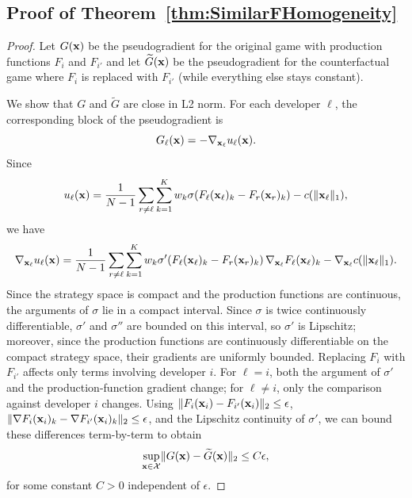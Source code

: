 \subsection{Proof of Theorem~\ref{thm:SimilarFHomogeneity}}
\label{app:SimilarFHomogeneity}
\SimilarFHomogeneity*
\begin{proof}
Let $G(\mathbf{x})$ be the pseudogradient for the original game with production functions $F_{i}$ and $F_{i'}$ and let $\widetilde{G}(\mathbf{x})$ be the pseudogradient for the counterfactual game where $F_{i}$ is replaced with $F_{i'}$ (while everything else stays constant). 

We show that $G$ and $\widetilde{G}$ are close in L2 norm. 
For each developer $\ell$, the corresponding block of the pseudogradient is
\[
G_\ell(\mathbf{x})=-\nabla_{\mathbf{x}_\ell}u_\ell(\mathbf{x}).
\]
Since
\[
u_\ell(\mathbf{x})=\frac{1}{N-1}\sum_{r\neq \ell}\sum_{k=1}^K w_k\sigma\!\left(F_\ell(\mathbf{x}_\ell)_k-F_r(\mathbf{x}_r)_k\right)-c(\lVert\mathbf{x}_\ell\rVert_1),
\]
we have
\[
\nabla_{\mathbf{x}_\ell}u_\ell(\mathbf{x})=\frac{1}{N-1}\sum_{r\neq \ell}\sum_{k=1}^K w_k \sigma' \!\left(F_\ell(\mathbf{x}_\ell)_k-F_r(\mathbf{x}_r)_k\right)\nabla_{\mathbf{x}_\ell}F_\ell(\mathbf{x}_\ell)_k-\nabla_{\mathbf{x}_\ell}c(\lVert\mathbf{x}_\ell\rVert_1).
\]
Since the strategy space is compact and the production functions are continuous, the arguments of $\sigma$ lie in a compact interval.
Since $\sigma$ is twice continuously differentiable, $\sigma'$ and $\sigma''$ are bounded on this interval, so $\sigma'$ is Lipschitz; moreover, since the production functions are continuously differentiable on the compact strategy space, their gradients are uniformly bounded.
Replacing $F_i$ with $F_{i'}$ affects only terms involving developer $i$.
For $\ell=i$, both the argument of $\sigma'$ and the production-function gradient change; for $\ell\neq i$, only the comparison against developer $i$ changes. 
Using $\lVert F_i(\mathbf{x}_i)-F_{i'}(\mathbf{x}_i)\rVert_2\leq\epsilon$, $\lVert \nabla F_i(\mathbf{x}_i)_k-\nabla F_{i'}(\mathbf{x}_i)_k\rVert_2\leq\epsilon$, and the Lipschitz continuity of $\sigma'$, we can bound these differences term-by-term to obtain
\[
\sup_{\mathbf{x}\in\mathcal X}\lVert G(\mathbf{x})-\widetilde G(\mathbf{x})\rVert_2 \leq C\epsilon,
\] 
for some constant $C>0$ independent of $\epsilon$.



\end{proof}
